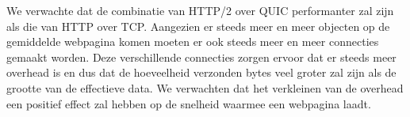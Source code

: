 \documentclass[fleqn,10pt]{voorstel}
\begin{document}
We verwachte dat de combinatie van HTTP/2 over QUIC performanter zal zijn als die van HTTP over TCP. Aangezien er steeds meer en meer objecten op de gemiddelde webpagina komen moeten er ook steeds meer en meer connecties gemaakt worden. Deze verschillende connecties zorgen ervoor dat er steeds meer overhead is en dus dat de hoeveelheid verzonden bytes veel groter zal zijn als de grootte van de effectieve data. We verwachten dat het verkleinen van de overhead een positief effect zal hebben op de snelheid waarmee een webpagina laadt. 


\printbibliography[heading=bibintoc]
\end{document}

